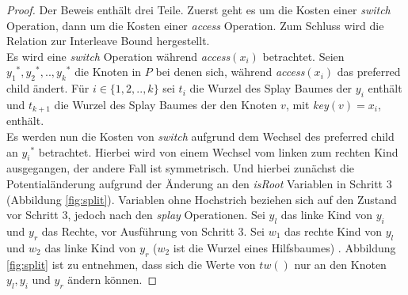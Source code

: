 \documentclass[a4paper,12pt]{article}
\begin{document}
\begin{proof}
	Der Beweis enthält drei Teile. Zuerst geht es um die Kosten einer \textit{switch} Operation, dann um die Kosten einer  \textit{access} Operation. Zum Schluss wird die Relation zur Interleave Bound hergestellt.\\
	Es wird eine \textit{switch} Operation während \textit{access}$\left(x_i\right)$ betrachtet. Seien ${y_1}^*, {y_2}^*,..,{y_k}^*$ die Knoten in $P$ bei denen sich, während  \textit{access}$\left(x_i\right)$ das preferred child ändert.  Für $i \in \{1, 2,.., k\}$ sei $t_i$ die Wurzel des Splay Baumes der $y_i$ enthält und $t_{k+1}$ die Wurzel des Splay Baumes der den Knoten $v$, mit \textit{key}$\left(v\right) = x_i$, enthält.\\
	Es werden nun die Kosten von \textit{switch} aufgrund dem Wechsel des preferred child an ${y_i}^*$ betrachtet. Hierbei wird von einem Wechsel vom linken zum rechten Kind ausgegangen, der andere Fall ist symmetrisch. Und hierbei zunächst die Potentialänderung aufgrund der Änderung an den \textit{isRoot} Variablen in Schritt 3 (Abbildung \ref{fig:split}). Variablen ohne Hochstrich beziehen sich auf den Zustand vor Schritt 3, jedoch nach den \textit{splay} Operationen. Sei $y_l$ das linke Kind von $y_i$ und $y_r$ das Rechte, vor Ausführung von Schritt 3. Sei $w_1$ das rechte Kind von $y_l$ und $w_2$ das linke Kind von $y_r$  ($w_2$ ist die Wurzel eines Hilfsbaumes) . Abbildung \ref{fig:split} ist zu entnehmen, dass sich die Werte von $\mathit{tw}\left(\right)$ nur an den Knoten $y_l, y_i$ und $y_r$ ändern können.
	

\end{proof}
\end{document}
